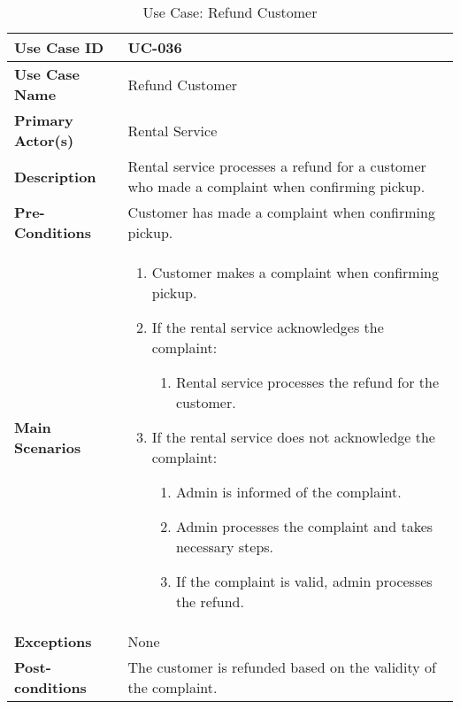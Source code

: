 \begin{table}[ht]
    \centering
    \begin{tabular}{|l|p{}|}
        \hline
        \textbf{Use Case ID} & UC-036 \\
        \hline
        \textbf{Use Case Name} & Refund Customer \\
        \hline
        \textbf{Primary Actor(s)} & Rental Service \\
        \hline
        \textbf{Description} & Rental service processes a refund for a customer who made a complaint when confirming pickup. \\
        \hline
        \textbf{Pre-Conditions} & Customer has made a complaint when confirming pickup. \\
        \hline
        \textbf{Main Scenarios} & 
        \begin{enumerate}[label=\arabic*.,itemsep=0pt]
            \item Customer makes a complaint when confirming pickup.
            \item If the rental service acknowledges the complaint:
                \begin{enumerate}[label=\alph*.,itemsep=0pt]
                    \item Rental service processes the refund for the customer.
                \end{enumerate}
            \item If the rental service does not acknowledge the complaint:
                \begin{enumerate}[label=\alph*.,itemsep=0pt]
                    \item Admin is informed of the complaint.
                    \item Admin processes the complaint and takes necessary steps.
                    \item If the complaint is valid, admin processes the refund.
                \end{enumerate}
        \end{enumerate} \\
        \hline
        \textbf{Exceptions} & None \\
        \hline
        \textbf{Post-conditions} & The customer is refunded based on the validity of the complaint. \\
        \hline
    \end{tabular}
    \label{tab:use-case-refund-customer}
    \caption{Use Case: Refund Customer}
\end{table}


\clearpage
